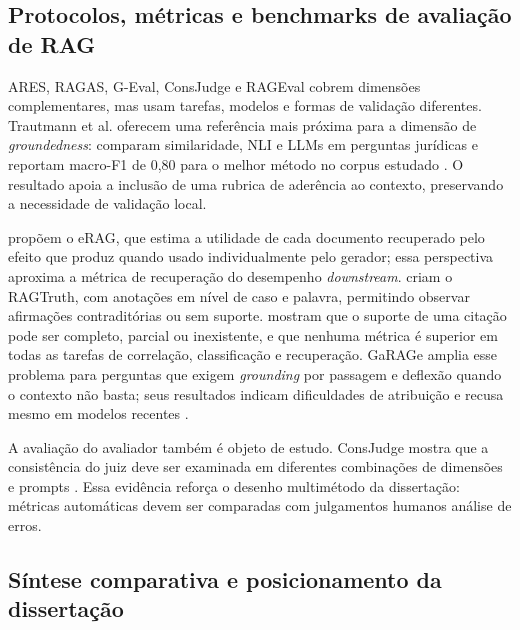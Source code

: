 \subsection{Protocolos, métricas e benchmarks de avaliação de RAG}

ARES, RAGAS, G-Eval, ConsJudge e RAGEval cobrem dimensões complementares, mas usam tarefas, modelos e formas de validação diferentes.
Trautmann et al. oferecem uma referência mais próxima para a dimensão de \textit{groundedness}: comparam similaridade, NLI e LLMs em perguntas
jurídicas e reportam macro-F1 de 0,80 para o melhor método no corpus estudado \parencite{trautmannEtAl2024groundedness}. O resultado
apoia a inclusão de uma rubrica de aderência ao contexto, preservando a necessidade de validação local.

\textcite{salemiZamani2024erag} propõem o eRAG, que estima a utilidade de cada documento recuperado pelo efeito que produz quando usado individualmente
pelo gerador; essa perspectiva aproxima a métrica de recuperação do desempenho \textit{downstream}. \textcite{niuEtAl2024ragtruth}
criam o RAGTruth, com anotações em nível de caso e palavra, permitindo observar afirmações contraditórias ou sem suporte.
\textcite{zhangEtAl2024fineGrainedCitation} mostram que o suporte de uma citação pode ser completo, parcial ou inexistente, e que
nenhuma métrica é superior em todas as tarefas de correlação, classificação e recuperação.
GaRAGe amplia esse problema para perguntas que exigem \textit{grounding} por passagem e deflexão quando o contexto não basta; seus resultados
indicam dificuldades de atribuição e recusa mesmo em modelos recentes \parencite{sorodocEtAl2025garage}.

A avaliação do avaliador também é objeto de estudo. ConsJudge mostra que a consistência do juiz deve ser examinada em diferentes
combinações de dimensões e prompts \parencite{liuEtAl2025judgeRag}. Essa evidência reforça o desenho multimétodo da dissertação:
métricas automáticas devem ser comparadas com julgamentos humanos  análise de erros.

\subsection{Síntese comparativa e posicionamento da dissertação}

